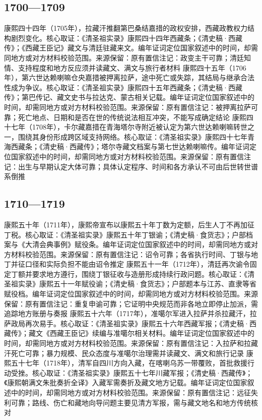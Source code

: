 \subsection{1700—1709}
康熙四十四年（1705年），拉藏汗推翻第巴桑结嘉措的政权安排，西藏政教权力结构剧烈变化。核心取证：《清圣祖实录》康熙四十四年西藏条；《清史稿·西藏传》；《西藏王臣记》藏文与清廷驻藏来文。编年证词定位国家叙述中的时间，却需同地方或对方材料校验范围。来源保留：原有置信注记：政变主干可靠；清廷知情、支持程度和地方反应须并读藏文、满文与旅行者材料
康熙四十五年（1706年），第六世达赖喇嘛仓央嘉措被押离拉萨，途中死亡或失踪，其结局与继承合法性成为争议。核心取证：《清圣祖实录》康熙四十五年西藏条；《清史稿·西藏传》；第巴传记、藏文史书与拉达克、蒙古相关记载。编年证词定位国家叙述中的时间，却需同地方或对方材料校验范围。来源保留：原有置信注记：被押离拉萨可靠；死亡地点、日期和是否在世的传统说法相互冲突，不能写成确定结论
康熙四十七年（1708年），卡尔藏嘉措在青海塔尔寺附近被认定为第六世达赖喇嘛转世之一，围绕其身份形成跨区域支持网络。核心取证：《清圣祖实录》康熙四十七年青海西藏条；《清史稿·西藏传》；塔尔寺藏文档案与第七世达赖喇嘛传。编年证词定位国家叙述中的时间，却需同地方或对方材料校验范围。来源保留：原有置信注记：出生与早期认定大体可靠；具体认定程序、时间和各方承认不可由后世转世谱系倒推
\subsection{1710—1719}
康熙五十年（1711年），康熙帝宣布以康熙五十年丁数为定额，后生人丁不再加征丁税。核心取证：《清圣祖实录》康熙五十年丁银谕；《清史稿·食货志》；户部档案与《大清会典事例》赋役条。编年证词定位国家叙述中的时间，却需同地方或对方材料校验范围。来源保留：原有置信注记：诏令可靠；各省执行时间、丁银与地丁并征口径和实际负担不能由诏令推定
康熙五十一年（1712年），清廷再次谕令固定丁额并要求地方遵行，围绕丁银征收与造册形成持续行政问题。核心取证：《清圣祖实录》康熙五十一年赋役谕；《清史稿·食货志》；户部题本与江苏、直隶等省赋役档。编年证词定位国家叙述中的时间，却需同地方或对方材料校验范围。来源保留：原有置信注记：重复申谕可靠；它证明中央规范而非各地立即停止加派，需追踪地方账册与奏报
康熙五十六年（1717年），准噶尔军进入拉萨并杀拉藏汗，拉萨政局再次易手。核心取证：《清圣祖实录》康熙五十六年西藏军报；《清史稿·西藏传》；藏文《西藏王臣记》续编与准噶尔相关材料。编年证词定位国家叙述中的时间，却需同地方或对方材料校验范围。来源保留：原有置信注记：入拉萨和拉藏汗死亡可靠；暴力规模、民众态度与准噶尔治理需并读藏文、满文和旅行记录
康熙五十七年（1718年），清军自四川方向入藏，在喀喇乌苏一带覆败，首批救援行动受挫。核心取证：《清圣祖实录》康熙五十七年川藏军报；《清史稿·西藏传》；《康熙朝满文朱批奏折全译》入藏军需奏折及藏文地方记载。编年证词定位国家叙述中的时间，却需同地方或对方材料校验范围。来源保留：原有置信注记：远征失利可靠；路线、伤亡和藏地向导问题主要见清方军报，需与藏文地名和地方传统核对

